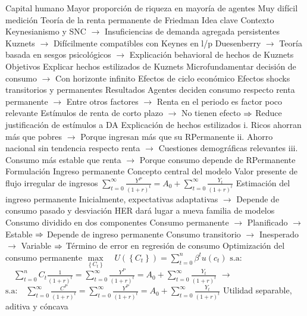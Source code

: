 \documentclass{nuevotema}
\begin{document}
\begin{esquemal}
				\4 Capital humano
				\4[] Mayor proporción de riqueza en mayoría de agentes
				\4[] Muy difícil medición
		\2 Teoría de la renta permanente de Friedman
			\3 Idea clave
				\4 Contexto
				\4[] Keynesianismo y SNC
				\4[] $\to$ Insuficiencias de demanda agregada persistentes
				\4[] Kuznets
				\4[] $\to$ Difícilmente compatibles con Keynes en l/p
				\4[] Duesenberry
				\4[] $\to$ Teoría basada en sesgos psicológicos
				\4[] $\to$ Explicación behavioral de hechos de Kuznets
				\4 Objetivos
				\4[] Explicar hechos estilizados de Kuznets
				\4[] Microfundamentar decisión de consumo
				\4[] $\to$ Con horizonte infinito
				\4[] Efectos de ciclo económico
				\4[] Efectos shocks transitorios y permanentes
				\4 Resultados
				\4[] Agentes deciden consumo respecto renta permanente
				\4[] $\to$ Entre otros factores
				\4[] $\to$ Renta en el periodo es factor poco relevante
				\4[] Estímulos de renta de corto plazo
				\4[] $\to$ No tienen efecto
				\4[] $\Rightarrow$ Reduce justificación de estímulos a DA
				\4[] Explicación de hechos estilizados
				\4[] i. Ricos ahorran más que pobres
				\4[] $\to$ Porque ingresan más que su RPermanente
				\4[] ii. Ahorro nacional sin tendencia respecto renta
				\4[] $\to$ Cuestiones demográficas relevantes
				\4[] iii. Consumo más estable que renta
				\4[] $\to$ Porque consumo depende de RPermanente
			\3 Formulación
				\4 Ingreso permanente
				\4[] Concepto central del modelo
				\4[] Valor presente de flujo irregular de ingresos
				\4[] $\sum_{t=0}^\infty \frac{Y^P}{(1+r)^t} = A_0 + \sum_{t=0}^\infty \frac{Y_t}{(1+r)^t}$
				\4 Estimación del ingreso permanente
				\4[] Inicialmente, expectativas adaptativas
				\4[] $\to$ Depende de consumo pasado y desviación
				\4[] HER dará lugar a nueva familia de modelos
				\4 Consumo dividido en dos componentes
				\4[] Consumo permanente
				\4[] $\to$ Planificado
				\4[] $\to$ Estable
				\4[] $\Rightarrow$ Depende de ingreso permanente
				\4[] Consumo transitorio
				\4[] $\to$ Inesperado
				\4[] $\to$ Variable
				\4[] $\Rightarrow$ Término de error en regresión de consumo
				\4 Optimización del consumo permanente
				\4[] $\underset{\left\lbrace C_t \right\rbrace}{\max}\quad U(\left\lbrace C_t \right\rbrace) = \sum_{t=0}^n \beta^t u(c_t)$
				\4[] $\text{s.a:}$
				\4[] $\quad \sum_{t=0}^n C_t \frac{1}{(1+r)^t} = \sum_{t=0}^\infty \frac{Y^P}{(1+r)^t} = A_0 + \sum_{t=0}^\infty \frac{Y_t}{(1+r)^t}$
				\4[] $\to$ $\text{s.a:} \quad \sum_{t=0}^\infty \frac{C^P}{(1+r)^t} = \sum_{t=0}^\infty \frac{Y^P}{(1+r)^t} = A_0 + \sum_{t=0}^\infty \frac{Y_t}{(1+r)^t}$
				\4[] Utilidad separable, aditiva y cóncava

\end{esquemal}
\end{document}
